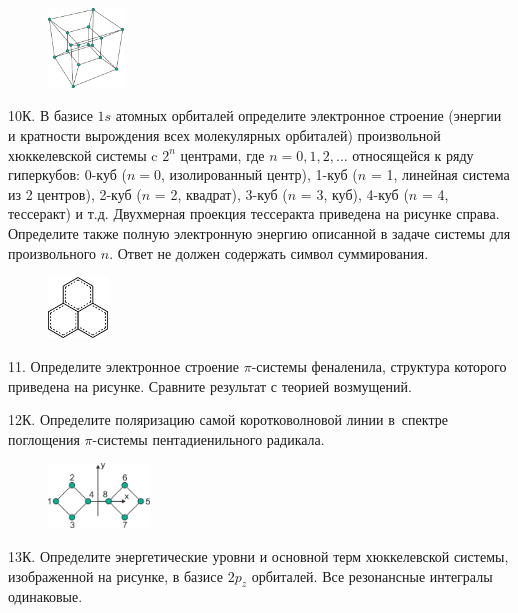 \begin{figure} %
    \centering
    \vspace{0mm}
    \includegraphics[width=20mm]{images/Fig_1_7_10.png}
    \vspace{-4mm}
\end{figure}
10К. В базисе $1s$ атомных орбиталей определите электронное строение (энергии и кратности вырождения всех молекулярных орбиталей) произвольной хюккелевской системы c $2^n$ центрами, где $n=0, 1, 2,\ldots$ относящейся к ряду гиперкубов: 0-куб ($n=0$, изолированный центр), 1-куб ($n$ = 1, линейная система из 2 центров), 2-куб ($n$ = 2, квадрат), 3-куб ($n$ = 3, куб), 4-куб ($n$ = 4, тессеракт) и т.д. Двухмерная проекция тессеракта приведена на рисунке справа. Определите также полную электронную энергию описанной в задаче системы для произвольного $n$. Ответ не должен содержать символ суммирования.
\par
\begin{figure} %
    \centering
    \vspace{-9mm}
    \includegraphics[width=16mm]{images/Fig_1_7_11.png}
    \vspace{-7mm}
\end{figure}
11. Определите электронное строение $\pi$-системы феналенила, структура которого приведена на рисунке. Сравните результат с теорией возмущений.
\par
12К. Определите поляризацию самой коротковолновой линии в~спектре поглощения $\pi$-системы пентадиенильного радикала.
\par
\begin{figure} %
    \centering
    \vspace{-9mm}
    \includegraphics[width=27mm]{images/Fig_1_7_13.png}
    \vspace{-6mm}
\end{figure}
13К. Определите энергетические уровни и основной терм хюккелевской системы, изображенной на рисунке, в базисе $2p_z$ орбиталей. Все резонансные интегралы одинаковые.
\par